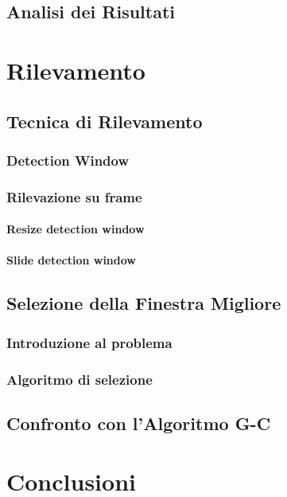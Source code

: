     \section{Analisi dei Risultati}
    \label{sec:Analisi dei Risultati}

\chapter{Rilevamento}
\label{chap:rilevamento}
    \section{Tecnica di Rilevamento}
    \label{sec:detection_tecnique}
        \subsection{Detection Window}
        \subsection{Rilevazione su frame}
            \subsubsection{Resize detection window}
            \subsubsection{Slide detection window}
    \section{Selezione della Finestra Migliore} %
    \label{sec:best_detection_window}
        \subsection{Introduzione al problema}
        \subsection{Algoritmo di selezione}
    \section{Confronto con l'Algoritmo G-C} %
    \label{sec:gc_algorithm_comparison}

\chapter{Conclusioni}

